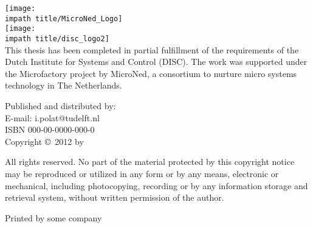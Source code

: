 
\noindent
\texttt{[image: \\impath title/MicroNed\_Logo]}\hspace*{0.75cm}\\[2em]
\texttt{[image: \\impath title/disc\_logo2]}\hspace*{0.75cm}\\[1em]

\noindent This thesis has been completed in partial fulfillment of
the requirements of the Dutch Institute for Systems and Control
(DISC). The work was supported under the Microfactory project by
MicroNed, a consortium to nurture micro systems technology in
The Netherlands.

\vspace*{\fill}


\noindent Published and distributed by: \theauthor \\
E-mail: i.polat@tudelft.nl\\

\bigskip{}
\noindent ISBN 000-00-0000-000-0\\
\noindent Copyright \copyright~2012 by \theauthor


\bigskip{}
\noindent All rights reserved. No part of the material protected by
this copyright notice may be reproduced or utilized in any form or
by any means, electronic or mechanical, including photocopying,
recording or by any information storage and retrieval system,
without written permission of the author.

\bigskip{}

\noindent Printed by some company
